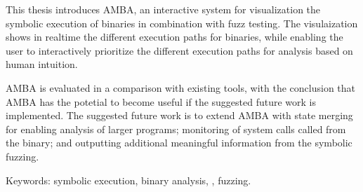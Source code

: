 This thesis introduces AMBA, an interactive system for visualization
the symbolic execution of binaries in combination with fuzz testing. The
visulaization shows in realtime the different execution paths for binaries,
while enabling the user to interactively prioritize the different execution
paths for analysis based on human intuition.

AMBA is evaluated in a comparison with existing tools, with the conclusion
that AMBA has the potetial to become useful if the suggested future work is
implemented. The suggested future work is to extend AMBA with state merging for
enabling analysis of larger programs; monitoring of system calls called from
the binary; and outputting additional meaningful information from the symbolic
fuzzing.

Keywords: symbolic execution, binary analysis, \stoe{}, fuzzing.

